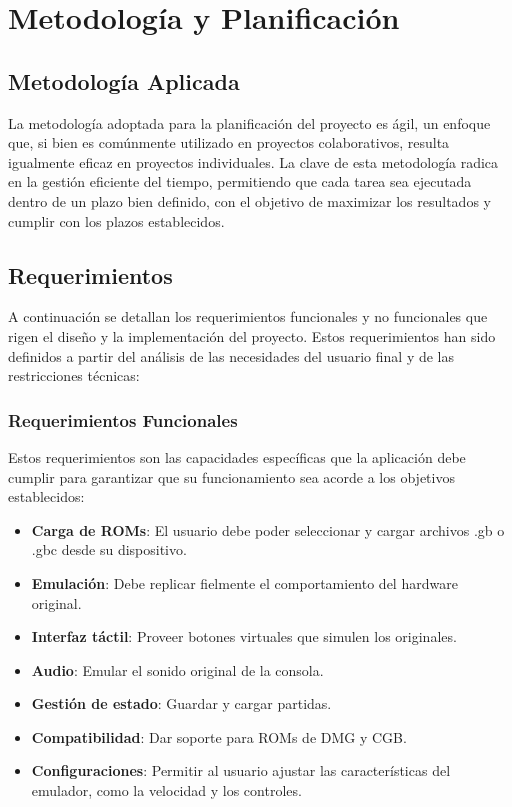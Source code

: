 \chapter{Metodología y Planificación}
\label{planificacion}
\section{Metodología Aplicada}
La metodología adoptada para la planificación del proyecto es ágil, un enfoque que, si bien es comúnmente utilizado en proyectos colaborativos, resulta igualmente eficaz en proyectos individuales. La clave de esta metodología radica en la gestión eficiente del tiempo, permitiendo que cada tarea sea ejecutada dentro de un plazo bien definido, con el objetivo de maximizar los resultados y cumplir con los plazos establecidos.

\section{Requerimientos}

A continuación se detallan los requerimientos funcionales y no funcionales que rigen el diseño y la implementación del proyecto. Estos requerimientos han sido definidos a partir del análisis de las necesidades del usuario final y de las restricciones técnicas:

\subsection{Requerimientos Funcionales}

Estos requerimientos son las capacidades específicas que la aplicación debe cumplir para garantizar que su funcionamiento sea acorde a los objetivos establecidos:

\begin{itemize}
    \item \textbf{Carga de ROMs}: El usuario debe poder seleccionar y cargar archivos .gb o .gbc desde su dispositivo.
    \item \textbf{Emulación}: Debe replicar fielmente el comportamiento del hardware original.
    \item \textbf{Interfaz táctil}: Proveer botones virtuales que simulen los originales.
    \item \textbf{Audio}: Emular el sonido original de la consola.
    \item \textbf{Gestión de estado}: Guardar y cargar partidas.
    \item \textbf{Compatibilidad}: Dar soporte para ROMs de DMG y CGB.
    \item \textbf{Configuraciones}: Permitir al usuario ajustar las características del emulador, como la velocidad y los controles.
\end{itemize}

